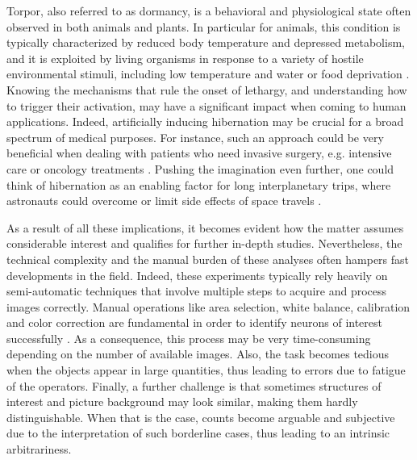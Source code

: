 Torpor, also referred to as dormancy, is a behavioral and physiological state often observed in both animals and plants. 
In particular for animals, this condition is typically characterized by reduced body temperature and depressed metabolism, and it is exploited by living organisms in response to a variety of hostile environmental stimuli, including low temperature and water or food deprivation \cite{GANSLOER2019328, WITHERS2019309}.
Knowing the mechanisms that rule the onset of lethargy, and understanding how to trigger their activation,  may have a significant impact when coming to human applications.
Indeed, artificially inducing hibernation may be crucial for a broad spectrum of medical purposes.
For instance, such an approach could be very beneficial when dealing with patients who need invasive surgery, e.g. intensive care or oncology treatments \cite{bouma2012induction, alam2012hypothermia, bellamy1996suspended}.
Pushing the imagination even further, one could think of hibernation as an enabling factor for long interplanetary trips, where astronauts could overcome or limit side effects of space travels \cite{CERRI2021218, bradford2020aerospace}.

As a result of all these implications, it becomes evident how the matter assumes considerable interest and qualifies for further in-depth studies.
Nevertheless, the technical complexity and the manual burden of these analyses often hampers fast developments in the field.
Indeed, these experiments typically rely heavily on semi-automatic techniques that involve multiple steps to acquire and process images correctly.  
Manual operations like area selection, white balance, calibration and color correction are fundamental in order to identify neurons of interest successfully \cite{luppi1, luppi2, luppi3}. 
As a consequence, this process may be very time-consuming depending on the number of available images. 
Also, the task becomes tedious when the objects appear in large quantities, thus leading to errors due to fatigue of the operators.
Finally, a further challenge is that sometimes structures of interest and picture background may look similar, making them hardly distinguishable. When that is the case, counts become arguable and subjective due to the interpretation of such borderline cases, thus leading to an intrinsic arbitrariness.

